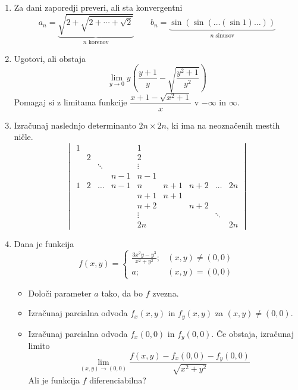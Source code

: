 \documentclass[a4paper,12pt]{article}
\begin{document}
\begin{enumerate}
\item
Za dani zaporedji preveri, ali sta konvergentni
\[
    a_n = \underbrace{\sqrt{2 + \sqrt{2 + \cdots + \sqrt{2}}}}_{\text{$n$ korenov}} \qquad
    b_n = \underbrace{\sin(\sin(\dots(\sin1)\dots))}_{\text{$n$ sinusov}}   
\]

\item
Ugotovi, ali obstaja
\[
    \lim_{y \to 0} y \left(\frac{y + 1}{y} - \sqrt{\frac{y^2 + 1}{y^2}}\right)    
\]
Pomagaj si z limitama funkcije $\dfrac{x + 1 - \sqrt{x^2 + 1}}{x}$ v $-\infty$ in $\infty$.

\item
Izračunaj naslednjo determinanto $2n \times 2n$, ki ima na neoznačenih mestih ničle.
\[
\begin{vmatrix}
    1 &   &        &     &  1     &     &     &        &    \\
      & 2 &        &     &  2     &     &     &        &    \\
      &   & \ddots &     & \vdots &     &     &        &    \\
      &   &        & n-1 & n-1    &     &     &        &    \\
    1 & 2 & \dots  & n-1 & n      & n+1 & n+2 & \dots  & 2n \\
      &   &        &     & n+1    & n+1 &     &        &    \\
      &   &        &     & n+2    &     & n+2 &        &    \\
      &   &        &     & \vdots &     &     & \ddots &    \\
      &   &        &     & 2n     &     &     &        & 2n
\end{vmatrix}
\]

\item
Dana je funkcija
\[
    f(x, y) = 
    \begin{cases}
        \frac{3x^{2}y - y^3}{x^2 + y^2}; & (x, y) \neq (0, 0) \\
        a;                               & (x, y) = (0, 0)
    \end{cases}    
\]
\begin{itemize}
    \item Določi parameter $a$ tako, da bo $f$ zvezna.
    \item Izračunaj parcialna odvoda $f_x(x, y)$ in $f_y(x, y)$ za $(x, y) \neq (0, 0)$.
    \item Izračunaj parcialna odvoda $f_x(0, 0)$ in $f_y(0, 0)$. Če obstaja, izračunaj limito
    \[
        \lim_{(x, y) \to (0, 0)} \frac{f(x, y) - f_x(0, 0) - f_y(0, 0)}{\sqrt{x^2 + y^2}}
    \]
    Ali je funkcija $f$ diferenciabilna?
\end{itemize}


\end{enumerate}
\end{document}
